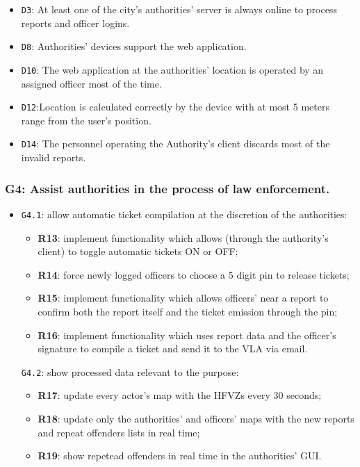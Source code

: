 \documentclass[12pt,a4paper]{article}
\begin{document}
	\begin{itemize}
			\item \texttt{D3}: At least one of the city's authorities' server is always online to process reports and officer logins.
			\item \texttt{D8}: Authorities' devices support the web application.
			\item \texttt{D10}: The web application at the authorities' location is operated by an assigned officer most of the time.
			\item \texttt{D12}:Location is calculated correctly by the device with at most 5 meters range from the user's position.
			\item \texttt{D14}: The personnel operating the Authority's client discards most of the invalid reports.
	\end{itemize}

\subsubsection{G4:  Assist authorities in the process of law enforcement.}
	
	\begin{itemize}
	\item \texttt{G4.1}: allow automatic ticket compilation at the discretion of the authorities:
							\begin{itemize}
									\item \textbf{R13}: implement functionality which allows (through the authority's client) to toggle automatic tickets ON or OFF;
									\item \textbf{R14}: force newly logged officers to choose a 5 digit pin to release tickets;
									\item \textbf{R15}: implement functionality which allows officers' near a report to confirm both the report itself and the ticket emission through the pin;
									\item \textbf{R16}: implement functionality which uses report data and the officer's signature to compile a ticket and send it to the VLA via email.
							\end{itemize}
	\texttt{G4.2}: show processed data relevant to the purpose:
							\begin{itemize}
									\item \textbf{R17}: update every actor's map with the HFVZs every 30 seconds;
									\item \textbf{R18}: update only the authorities' and officers' maps with the new reports and repeat offenders lists in real time;
									\item \textbf{R19}: show repetead offenders in real time in the authorities' GUI.
							\end{itemize}
	\end{itemize}
	
\end{document}

